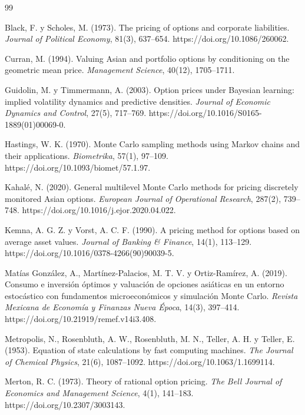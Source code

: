 \begin{thebibliography}{99}

Black, F. y Scholes, M. (1973). The pricing of options and corporate liabilities. \textit{Journal of Political Economy}, 81(3), 637--654. https://doi.org/10.1086/260062.

Curran, M. (1994). Valuing Asian and portfolio options by conditioning on the geometric mean price. \textit{Management Science}, 40(12), 1705--1711.

Guidolin, M. y Timmermann, A. (2003). Option prices under Bayesian learning: implied volatility dynamics and predictive densities. \textit{Journal of Economic Dynamics and Control}, 27(5), 717--769. https://doi.org/10.1016/S0165-1889(01)00069-0.

Hastings, W. K. (1970). Monte Carlo sampling methods using Markov chains and their applications. \textit{Biometrika}, 57(1), 97--109. https://doi.org/10.1093/biomet/57.1.97.

Kahalé, N. (2020). General multilevel Monte Carlo methods for pricing discretely monitored Asian options. \textit{European Journal of Operational Research}, 287(2), 739--748. https://doi.org/10.1016/j.ejor.2020.04.022.

Kemna, A. G. Z. y Vorst, A. C. F. (1990). A pricing method for options based on average asset values. \textit{Journal of Banking \& Finance}, 14(1), 113--129. https://doi.org/10.1016/0378-4266(90)90039-5.

Matías González, A., Martínez-Palacios, M. T. V. y Ortiz-Ramírez, A. (2019). Consumo e inversión óptimos y valuación de opciones asiáticas en un entorno estocástico con fundamentos microeconómicos y simulación Monte Carlo. \textit{Revista Mexicana de Economía y Finanzas Nueva Época}, 14(3), 397--414. https://doi.org/10.21919/remef.v14i3.408.

Metropolis, N., Rosenbluth, A. W., Rosenbluth, M. N., Teller, A. H. y Teller, E. (1953). Equation of state calculations by fast computing machines. \textit{The Journal of Chemical Physics}, 21(6), 1087--1092. https://doi.org/10.1063/1.1699114.

Merton, R. C. (1973). Theory of rational option pricing. \textit{The Bell Journal of Economics and Management Science}, 4(1), 141--183. https://doi.org/10.2307/3003143.


\end{thebibliography}
